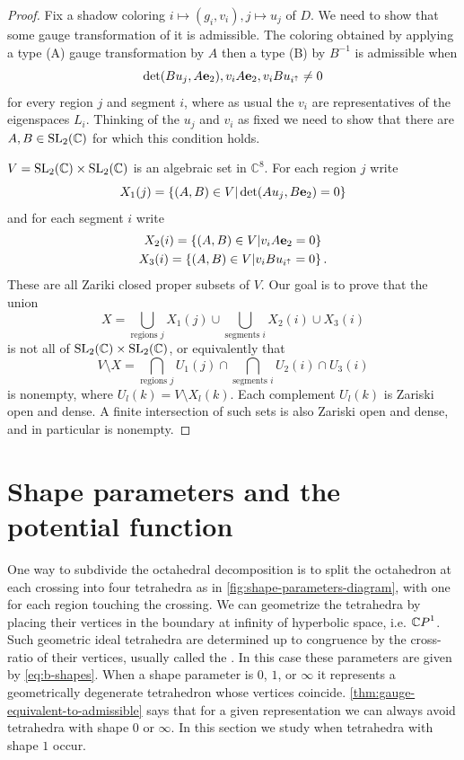 \documentclass[leqno]{sl2art}
\begin{document}
\begin{proof}
  Fix a shadow coloring \(i \mapsto (g_i, v_i), j \mapsto u_j\) of \(D\).
  We need to show that some gauge transformation of it is admissible.
  The coloring obtained by applying a type (A) gauge transformation by \(A\) then a type (B) by \(B^{-1}\) is admissible when
  \[
    \det(B u_j , A \mathrm{\mathbf{e}}_{2} ), v_i A \mathrm{\mathbf{e}}_{2}, v_i B u_{i^{\uparrow}} \ne 0
  \]
  for every region \(j\) and segment \(i\), where as usual the \(v_i\) are representatives of the eigenspaces \(L_i\).
  Thinking of the \(u_j\) and \(v_i\) as fixed we need to show that there are \(A, B \in \operatorname{SL}_2(\mathbb{C})\) for which this condition holds.

  \(V = \operatorname{SL}_2(\mathbb{C}) \times \operatorname{SL}_2(\mathbb{C})\) is an algebraic set in \(\mathbb{C}^{8}\).
  For each region \(j\) write
  \[
    X_1(j) = \set{(A,B) \in V | \det(A u_j , B \evec{2}) = 0 }
  \]
  and for each segment \(i\) write
  \[
    \begin{gathered}
      X_2(i) = \set{(A,B) \in V | v_i A \evec{2} = 0 }
    \\
    X_3(i) = \set{(A,B) \in V | v_i B u_{i^{\uparrow}} = 0 }
    .
    \end{gathered}
  \]
  These are all Zariki closed proper subsets of \(V\).
  Our goal is to prove that the union
  \[
    X =
    \bigcup_{\text{regions } j} X_1(j)
    \cup
    \bigcup_{\text{segments } i} X_2(i) \cup X_3(i)
  \]
  is not all of \(\operatorname{SL}_2(\mathbb{C}) \times \operatorname{SL}_2(\mathbb{C})\), or equivalently that
  \[
    V \setminus X = 
    \bigcap_{\text{regions } j} U_1(j)
    \cap
    \bigcap_{\text{segments } i} U_2(i) \cap U_3(i)
  \]
  is nonempty, where \(U_l(k) = V \setminus X_l(k)\).
  Each complement \(U_l(k)\) is Zariski open and dense.
  A finite intersection of such sets is also Zariski open and dense, and in particular is nonempty.
\end{proof}

\section{Shape parameters and the potential function}
\label{sec:potential}

One way to subdivide the octahedral decomposition is to split the octahedron at each crossing into four tetrahedra as in \cref{fig:shape-parameters-diagram}, with one for each region touching the crossing.
We can geometrize the tetrahedra by placing their vertices in the boundary at infinity of hyperbolic space, i.e. \(\psp\).
Such geometric ideal tetrahedra are determined up to congruence by the cross-ratio of their vertices, usually called the .
In this case these parameters are given by \cref{eq:b-shapes}.%
When a shape parameter is \(0\), \(1\), or \(\infty\) it represents a geometrically degenerate tetrahedron whose vertices coincide.
\cref{thm:gauge-equivalent-to-admissible} says that for a given representation we can always avoid tetrahedra with shape \(0\) or \(\infty\).
In this section we study when tetrahedra with shape \(1\) occur.
\end{document}
